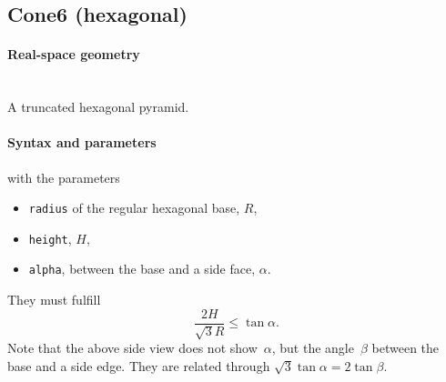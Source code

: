\clearpage
\subsection{Cone6 (hexagonal)} \label{sec:Cone6}

\paragraph{Real-space geometry}\strut\\
A truncated hexagonal pyramid.

\begin{figure}[h]
\hfill
{}
\hfill
{}
\hfill
\end{figure}

\FloatBarrier

\paragraph{Syntax and parameters}
\begin{quote}
\end{quote}
with the parameters
\begin{itemize}
\item \texttt{radius} of the regular hexagonal base, $R$,
\item \texttt{height}, $H$,
\item \texttt{alpha}, between the base and a side face, $\alpha$.
\end{itemize}
They must fulfill
\begin{displaymath}
  \dfrac{2H}{\sqrt{3}R}\le \tan{\alpha}.
\end{displaymath}
Note that the above side view does not show~$\alpha$,
but the angle~$\beta$ between the base and a side edge.
They are related through $\sqrt{3}\tan \alpha = 2 \tan \beta$. 

